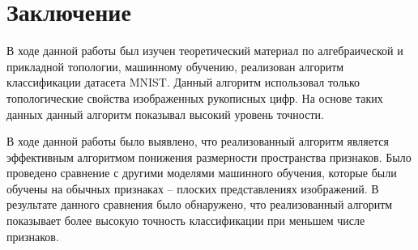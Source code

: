 \chapter*{Заключение}
В ходе данной работы был изучен теоретический материал по алгебраической и прикладной топологии, машинному обучению, реализован алгоритм классификации датасета MNIST. Данный алгоритм использовал только топологические свойства изображенных рукописных цифр. На основе таких данных данный алгоритм показывал высокий уровень точности.

В ходе данной работы было выявлено, что реализованный алгоритм является эффективным алгоритмом понижения размерности пространства признаков. Было проведено сравнение с другими моделями машинного обучения, которые были обучены на обычных признаках -- плоских представлениях изображений. В результате данного сравнения было обнаружено, что реализованный алгоритм показывает более высокую точность классификации при меньшем числе признаков.

